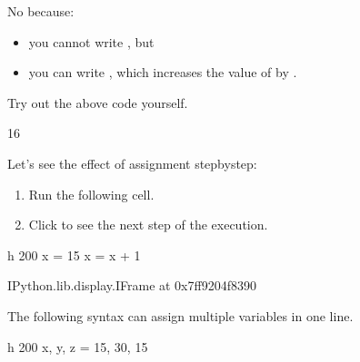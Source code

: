 \documentclass[letterpaper,10pt,english]{sphinxmanual}
\begin{document}

No because:
\begin{itemize}
\item {} 
you cannot write , but

\item {} 
you can write , which increases the value of  by .

\end{itemize}

 Try out the above code yourself.

\begin{sphinxVerbatim}[commandchars=\\\{\}]
    
\end{sphinxVerbatim}

\begin{sphinxVerbatim}[commandchars=\\\{\}]
16
\end{sphinxVerbatim}

Let’s see the effect of assignment step\sphinxhyphen{}by\sphinxhyphen{}step:
\begin{enumerate}
%
\item {} 
Run the following cell.

\item {} 
Click  to see the next step of the execution.

\end{enumerate}

\begin{sphinxVerbatim}[commandchars=\\\{\}]
 \PYGZhy{}h 200
x = 15
x = x + 1
\end{sphinxVerbatim}

\begin{sphinxVerbatim}[commandchars=\\\{\}]
\PYGZlt{}IPython.lib.display.IFrame at 0x7ff9204f8390\PYGZgt{}
\end{sphinxVerbatim}

The following  syntax can assign multiple variables in one line.

\begin{sphinxVerbatim}[commandchars=\\\{\}]
 \PYGZhy{}h 200
x, y, z = \PYGZsq{}15\PYGZsq{}, \PYGZsq{}30\PYGZsq{}, 15
\end{sphinxVerbatim}
\end{document}
